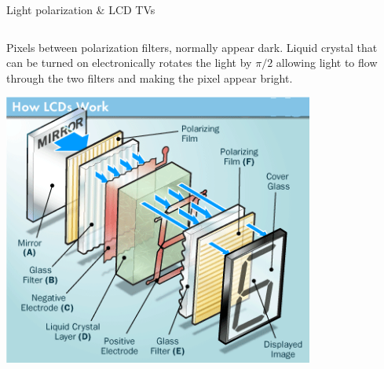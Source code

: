 \begin{frame}{Light polarization \& LCD TVs}

\begin{columns}
  \begin{column}{0.60\textwidth}
    {\scriptsize
     Pixels between polarization filters, normally appear dark.
     Liquid crystal that can be turned on electronically rotates the light by $\pi/2$
     allowing light to flow through the two filters and making the pixel appear bright.
    }
    \begin{center}
       \includegraphics[width=0.80\textwidth]{./images/schematics/how_lcds_work.png}\\
    \end{center}
  \end{column}
  \begin{column}{0.40\textwidth}

\end{column}
\end{columns}
\end{frame}
